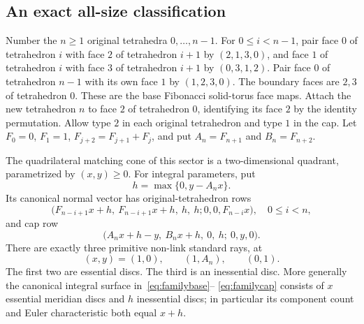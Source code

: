 \subsection{An exact all-size classification}

Number the $n\ge1$ original tetrahedra $0,\ldots,n-1$. For $0\le i<n-1$,
pair face $0$ of tetrahedron $i$ with face $2$ of tetrahedron $i+1$ by
$(2,1,3,0)$, and face $1$ of tetrahedron $i$ with face $3$ of tetrahedron
$i+1$ by $(0,3,1,2)$. Pair face $0$ of tetrahedron $n-1$ with its own
face $1$ by $(1,2,3,0)$. The boundary faces are $2,3$ of tetrahedron $0$.
These are the base Fibonacci solid-torus face maps. Attach the new tetrahedron $n$ to face $2$ of tetrahedron
$0$, identifying its face $2$ by the identity permutation. Allow type $2$
in each original tetrahedron and type $1$ in the cap. Let
$F_0=0$, $F_1=1$, $F_{j+2}=F_{j+1}+F_j$, and put
$A_n=F_{n+1}$ and $B_n=F_{n+2}$.

\begin{theorem}
\label{thm:family}
The quadrilateral matching cone of this sector is a two-dimensional quadrant,
parametrized by $(x,y)\ge0$. For integral parameters, put
\begin{equation}
 h=\max\{0,y-A_nx\}.
 \label{eq:hinge}
\end{equation}
Its canonical normal vector has original-tetrahedron rows
\begin{equation}
 \bigl(F_{n-i+1}x+h,\ F_{n-i+1}x+h,\ h,\ h;
          0,0,F_{n-i}x\bigr),\quad 0\le i<n,
 \label{eq:familybase}
\end{equation}
and cap row
\begin{equation}
 \bigl(A_nx+h-y,\ B_nx+h,\ 0,\ h;\ 0,y,0\bigr).
 \label{eq:familycap}
\end{equation}
There are exactly three primitive non-link standard rays, at
\begin{equation}
 (x,y)=(1,0),\qquad (1,A_n),\qquad (0,1).
 \label{eq:familyrays}
\end{equation}
The first two are essential discs. The third is an inessential disc. More
generally the canonical integral surface in~\eqref{eq:familybase}--
\eqref{eq:familycap} consists of $x$ essential meridian discs and $h$
inessential discs; in particular its component count and Euler
characteristic both equal $x+h$.
\end{theorem}

